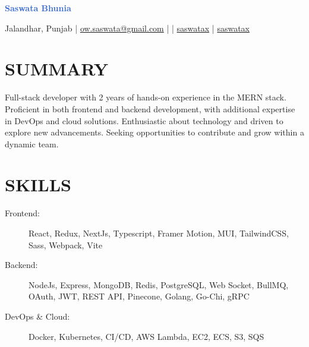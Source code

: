 \documentclass[]{resume}
\begin{document}
\textrm{\Huge\textcolor{highlight}{\textbf{Saswata Bhunia}}}
\vspace{.4em}

Jalandhar, Punjab | \href{mailto:ow.saswata@gmail.com}{\faEnvelope \space ow.saswata@gmail.com} | \faPhone {} | \href{https://www.linkedin.com/in/saswatax}{\faLinkedin \space saswatax} | \href{https://github.com/saswatax}{\faGithub \space saswatax}
\vspace{.4em}

\section{SUMMARY}
Full-stack developer with 2 years of hands-on experience in the MERN stack. Proficient in both frontend and backend development, with additional expertise in DevOps and cloud solutions. Enthusiastic about technology and driven to explore new advancements. Seeking opportunities to contribute and grow within a dynamic team.

\section{SKILLS}
\begin{description}
  \item[Frontend:] React, Redux, NextJs, Typescript, Framer Motion, MUI, TailwindCSS, Sass, Webpack, Vite
  \item[Backend:] NodeJs, Express, MongoDB, Redis, PostgreSQL, Web Socket, BullMQ, OAuth, JWT, REST API, Pinecone, Golang, Go-Chi, gRPC
  \item[DevOps \& Cloud:] Docker, Kubernetes, CI/CD, AWS Lambda, EC2, ECS, S3, SQS
\end{description}
\end{document}
